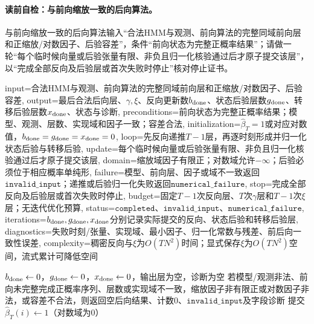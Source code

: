 \paragraph{读前自检：与前向缩放一致的后向算法。}与前向缩放一致的后向算法输入“合法HMM与观测、前向算法的完整同域前向层和正缩放/对数因子、后验容差”，条件“前向状态为完整正概率结果”；请做一轮“每个临时候向量或后验张量有限、非负且归一化核验通过后才原子提交该层”，以“完成全部反向及后验层或首次失败时停止”核对停止证书。\par

\begin{AlgorithmContract}{
  input={合法HMM与观测、前向算法的完整同域前向层和正缩放/对数因子、后验容差},
  output={最后合法后向层、$\gamma,\xi$、反向更新数$b_{\rm done}$、状态后验层数$g_{\rm done}$、转移后验层数$x_{\rm done}$、状态与诊断},
  preconditions={前向状态为完整正概率结果；模型、观测、层数、实现域和因子一致；容差合法},
  initialization={$\widehat\beta_T=1$或对应对数值，$b_{\rm done}=g_{\rm done}=x_{\rm done}=0$},
  loop={先反向递推$T-1$层，再逐时刻形成并归一化状态后验与转移后验},
  update={每个临时候向量或后验张量有限、非负且归一化核验通过后才原子提交该层},
  domain={缩放域因子有限正；对数域允许$-\infty$；后验必须位于相应概率单纯形},
  failure={模型、前向层、因子或域不一致返回$\mathtt{invalid\_input}$；递推或后验归一化失败返回$\mathtt{numerical\_failure}$},
  stop={完成全部反向及后验层或首次失败时停止},
  budget={固定$T-1$次反向层、$T$次$\gamma$层和$T-1$次$\xi$层；无迭代优化预算},
  status={$\mathtt{completed}$、$\mathtt{invalid\_input}$、$\mathtt{numerical\_failure}$},
  iterations={$b_{\rm done},g_{\rm done},x_{\rm done}$分别记录实际提交的反向、状态后验和转移后验层},
  diagnostics={失败时刻/张量、实现域、最小因子、归一化常数与残差、前后向一致性误差},
  complexity={稠密反向与$\xi$为$O(TN^2)$时间；显式保存$\xi$为$O(TN^2)$空间，流式累计可降低空间}
}
\begin{algorithm}[H]
\caption{与前向缩放一致的后向算法}\label{alg:V3-C05-backward-scaled}
$b_{\rm done}\leftarrow0$，$g_{\rm done}\leftarrow0$，$x_{\rm done}\leftarrow0$，输出层为空，诊断为空\;
若模型/观测非法、前向未完整完成正概率序列、层数或实现域不一致，缩放因子非有限正或对数因子非法，或容差不合法，则返回空后向结果、计数$0$、$\mathtt{invalid\_input}$及字段诊断\;
提交$\widehat\beta_T(i)\leftarrow1$（对数域为$0$）\;
\end{algorithm}
\end{AlgorithmContract}
